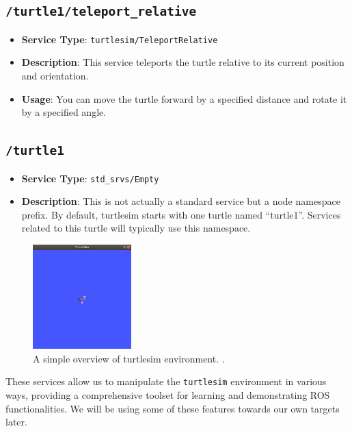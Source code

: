 \documentclass[conference]{IEEEtran}
\begin{document}
\subsection{\texttt{/turtle1/teleport\_relative}}
\begin{itemize}
    \item \textbf{Service Type}: \texttt{turtlesim/TeleportRelative}
    \item \textbf{Description}: This service teleports the turtle relative to its current position and orientation.
    \item \textbf{Usage}: You can move the turtle forward by a specified distance and rotate it by a specified angle.
\end{itemize}

\subsection{\texttt{/turtle1}}
\begin{itemize}
    \item \textbf{Service Type}: \texttt{std\_srvs/Empty}
    \item \textbf{Description}: This is not actually a standard service but a node namespace prefix. By default, turtlesim starts with one turtle named ``turtle1''. Services related to this turtle will typically use this namespace.
\end{itemize}

\begin{figure}[htbp]
    \centerline{\includegraphics[width=0.34\textwidth]{figures/turtlesim.png}}
    \caption{A simple overview of turtlesim environment. \cite{b3}.}
    \label{fig:turtlesim}
\end{figure}
\vspace{10px}

These services allow us to manipulate the \texttt{turtlesim} environment in various ways, providing a comprehensive toolset for learning and demonstrating ROS functionalities. We will be using some of these features towards our own targets later.
\end{document}
